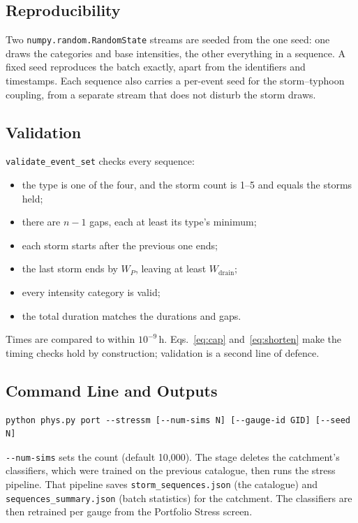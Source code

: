 \documentclass[11pt,a4paper]{article}
\begin{document}
\subsection{Reproducibility}
Two \texttt{numpy.random.RandomState} streams are seeded from the one seed: one draws the
categories and base intensities, the other everything in a sequence. A fixed seed
reproduces the batch exactly, apart from the identifiers and timestamps. Each sequence also
carries a per-event seed for the storm--typhoon coupling, from a separate stream that does
not disturb the storm draws.

\subsection{Validation}
\texttt{validate\_event\_set} checks every sequence:
\begin{itemize}[nosep]
    \item the type is one of the four, and the storm count is 1--5 and equals the storms held;
    \item there are $n-1$ gaps, each at least its type's minimum;
    \item each storm starts after the previous one ends;
    \item the last storm ends by $W_P$, leaving at least $W_{\text{drain}}$;
    \item every intensity category is valid;
    \item the total duration matches the durations and gaps.
\end{itemize}
Times are compared to within $10^{-9}$\,h. Eqs.~\eqref{eq:cap} and~\eqref{eq:shorten} make
the timing checks hold by construction; validation is a second line of defence.

\subsection{Command Line and Outputs}
\begin{verbatim}
python phys.py port --stressm [--num-sims N] [--gauge-id GID] [--seed N]
\end{verbatim}
\texttt{-{}-num-sims} sets the count (default 10{,}000). The stage deletes the catchment's
classifiers, which were trained on the previous catalogue, then runs the stress pipeline.
That pipeline saves \texttt{storm\_sequences.json} (the catalogue) and
\texttt{sequences\_summary.json} (batch statistics) for the catchment. The classifiers are
then retrained per gauge from the Portfolio Stress screen.
\end{document}
